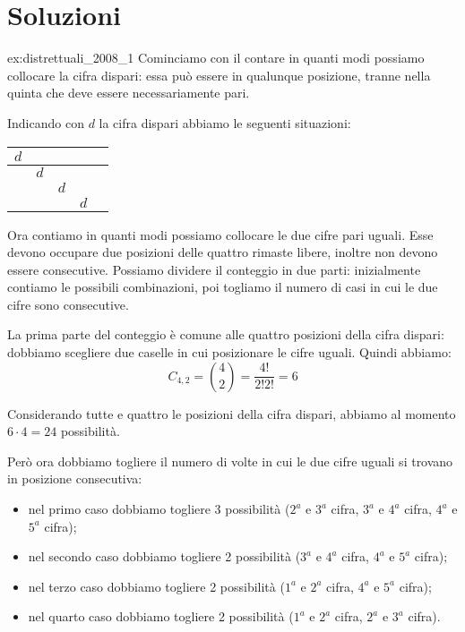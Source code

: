 \chapter{Soluzioni}
\label{ch:soluzioni}

\begin{soluzione}{ex:distrettuali_2008_1}
    Cominciamo con il contare in quanti modi possiamo collocare la cifra dispari: essa può essere in qualunque posizione,
    tranne nella quinta che deve essere necessariamente pari.

    Indicando con $d$ la cifra dispari abbiamo le seguenti situazioni:

    \begin{center}
    \begin{tabular}{|c|c|c|c|c|}
        \toprule
        $d$ & & & & \\
        \midrule
        & $d$ & & & \\
        \midrule
        & & $d$ & & \\
        \midrule
        & & & $d$ & \\
        \bottomrule
    \end{tabular}
    \end{center}

    Ora contiamo in quanti modi possiamo collocare le due cifre pari uguali.
    Esse devono occupare due posizioni delle quattro rimaste libere, inoltre non devono essere consecutive.
    Possiamo dividere il conteggio in due parti: inizialmente contiamo le possibili combinazioni, poi togliamo il numero
    di casi in cui le due cifre sono consecutive.

    La prima parte del conteggio è comune alle quattro posizioni della cifra dispari: dobbiamo scegliere due caselle
    in cui posizionare le cifre uguali.
    Quindi abbiamo:
    \begin{equation*}
        C_{4, 2} = \binom{4}{2} = \dfrac{4!}{2! 2!} = 6
    \end{equation*}

    Considerando tutte e quattro le posizioni della cifra dispari, abbiamo al momento $6 \cdot 4 = 24$ possibilità.

    Però ora dobbiamo togliere il numero di volte in cui le due cifre uguali si trovano in posizione consecutiva:
    \begin{itemize}
        \item nel primo caso dobbiamo togliere 3 possibilità ($2^a$ e $3^a$ cifra, $3^a$ e $4^a$ cifra, $4^a$ e $5^a$ cifra);
        \item nel secondo caso dobbiamo togliere 2 possibilità ($3^a$ e $4^a$ cifra, $4^a$ e $5^a$ cifra);
        \item nel terzo caso dobbiamo togliere 2 possibilità ($1^a$ e $2^a$ cifra, $4^a$ e $5^a$ cifra);
        \item nel quarto caso dobbiamo togliere 2 possibilità ($1^a$ e $2^a$ cifra, $2^a$ e $3^a$ cifra).
    \end{itemize}


\end{soluzione}
